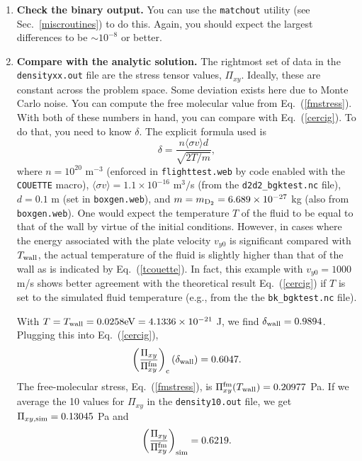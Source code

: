 \documentclass[12pt]{report}
\begin{document}
\begin{enumerate}
These files can be directly 
compared with the corresponding files in the {\tt examples} directory.
If you have repeated the run at the above-described length, you should
be able to match the text files exactly. The level of agreement in the
netCDF file should be several digits (perhaps as many as 10).
If a satisfactory match is not obtained, something is
amiss. Please contact the code authors (see Sec.~\ref{help}) if you feel
that a problem exists with the code as you downloaded it. 
  \item {\bf Check the binary output.} You can use the {\tt matchout}
utility (see Sec.~\ref{miscroutines}) to do this. Again, you should expect
the largest differences to be $\sim 10^{-8}$ or better.
  \item {\bf Compare with the analytic solution.} The rightmost set of data
in the {\tt densityxx.out} file are the stress tensor values, $\Pi_{xy}$. 
Ideally, these are constant across the problem space. Some deviation
exists here due to Monte Carlo noise. You
can compute the free molecular value from Eq.~(\ref{fmstress}). With both of
these numbers in hand, you can compare with Eq.~(\ref{cercig}). To do that, you
need to know $\delta$. The explicit formula used is
\begin{equation}
\delta = \frac{n \langle \sigma v \rangle d}{\sqrt{2 T / m}},
\end{equation}
where $n = 10^{20}$ m$^{-3}$ (enforced in {\tt flighttest.web} by code 
enabled with the \verb+COUETTE+ macro), $\langle \sigma v \rangle = 1.1
\times 10^{-16}$ m$^{3}/$s (from the {\tt d2d2\_bgktest.nc} file), $d = 0.1$ m
(set in {\tt boxgen.web}), and $m = m_{{\rm D}_{2}} = 6.689 \times 10^{-27}$ kg
(also from {\tt boxgen.web}). One would expect the temperature $T$ of the
fluid to be equal to that of the wall by virtue of the initial conditions. 
However, in cases where the energy associated with the plate velocity 
$v_{y0}$ is significant compared with $T_{\rm wall}$, the actual temperature
of the fluid is slightly higher than that of the wall as is indicated
by Eq.~(\ref{tcouette}). 
In fact, 
this example with $v_{y0} = 1000$ m/s 
shows better agreement with the theoretical result Eq.~(\ref{cercig})
if $T$ is set to the simulated fluid temperature (e.g., from the  
the {\tt bk\_bgktest.nc} file). 

With $T = T_{\rm wall} = 0.0258 {\rm eV} = 4.1336 \times 10^{-21}$ J, we find 
$\delta_{\rm wall} = 0.9894$.  Plugging this into Eq.~(\ref{cercig}),
\begin{equation}
\left( \frac{\Pi_{xy}}{\Pi_{xy}^{\rm fm}} \right)_{\rm c}(\delta_{\rm wall}) = 
0.6047.
\end{equation}
The free-molecular stress, Eq.~(\ref{fmstress}), is 
$\Pi_{xy}^{\rm fm}(T_{\rm wall}) = 0.20977$ Pa.
If we average the 10 values for $\Pi_{xy}$ in the {\tt density10.out} file, we
get $\Pi_{xy, {\rm sim}} = 0.13045$ Pa and 
\begin{equation}
\left( \frac{\Pi_{xy}}{\Pi_{xy}^{\rm fm}} \right)_{\rm sim} = 0.6219.
\end{equation}


\end{enumerate}
\end{document}
